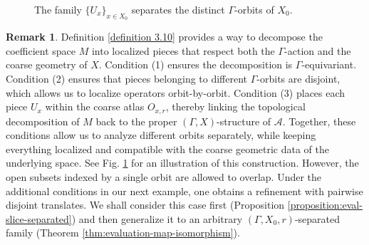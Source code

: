 \documentclass[pdflatex]{sn-jnl}
\theoremstyle{plain}
\theoremstyle{definition}
\newtheorem{remark}[theorem]{Remark}
\begin{document}
\begin{figure}[htbp]

\caption{The family $\{U_x\}_{x \in X_0}$ separates the distinct $\Gamma$-orbits of $X_0$.}
\label{fig:separated-family}
\end{figure}

\vspace{-0.8cm}
\begin{remark}
Definition \ref{definition 3.10} provides a way to decompose the coefficient space $M$ into localized pieces that respect both the $\Gamma$-action and the coarse geometry of $X$. Condition (1) ensures the decomposition is $\Gamma$-equivariant. Condition (2) ensures that pieces belonging to different $\Gamma$-orbits are disjoint, which allows us to localize operators orbit-by-orbit. Condition (3) places each piece $U_x$ within the coarse atlas $O_{x,r}$, thereby linking the topological decomposition of $M$ back to the proper $(\Gamma,X)$-structure of $\mathcal{A}$. Together, these conditions allow us to analyze different orbits separately, while keeping everything localized and compatible with the coarse geometric data of the underlying space.
See Fig. \ref{fig:separated-family} for an illustration of this construction. However, the open subsets indexed by a single orbit are allowed to overlap. Under the additional conditions in our next example, one obtains a refinement with pairwise disjoint translates. We shall consider this case first (Proposition \ref{proposition:eval-slice-separated}) and then generalize it to an arbitrary $(\Gamma, X_0,r)$-separated family (Theorem \ref{thm:evaluation-map-isomorphism}).
\end{remark}
\end{document}
